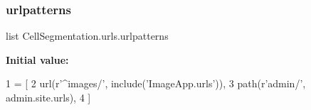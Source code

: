 \mbox{\label{namespace_cell_segmentation_1_1urls_a0888d3b70d4c1b6c3e6915ac2016a92a}} 
\subsubsection{\texorpdfstring{urlpatterns}{urlpatterns}}
{\footnotesize\ttfamily list Cell\+Segmentation.\+urls.\+urlpatterns}

{\bfseries Initial value\+:}
\begin{DoxyCode}
1 =  [
2     url(\textcolor{stringliteral}{r'^images/'}, include(\textcolor{stringliteral}{'ImageApp.urls'})),
3     path(\textcolor{stringliteral}{r'admin/'}, admin.site.urls),
4 ]
\end{DoxyCode}
